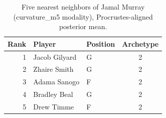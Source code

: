 \begin{table}[htbp]
  \centering\small
  \begin{tabular}{rllc}
    \toprule
    Rank & Player & Position & Archetype \\
    \midrule
    1 & Jacob Gilyard & G & 2 \\
    2 & Zhaire Smith & G & 2 \\
    3 & Adama Sanogo & F & 2 \\
    4 & Bradley Beal & G & 2 \\
    5 & Drew Timme & F & 2 \\
    \bottomrule
  \end{tabular}
  \caption{Five nearest neighbors of Jamal Murray (curvature_m5 modality), Procrustes-aligned posterior mean.}
  \label{tab:Jamal_Murray_neighbors_curvature_m5}
\end{table}

